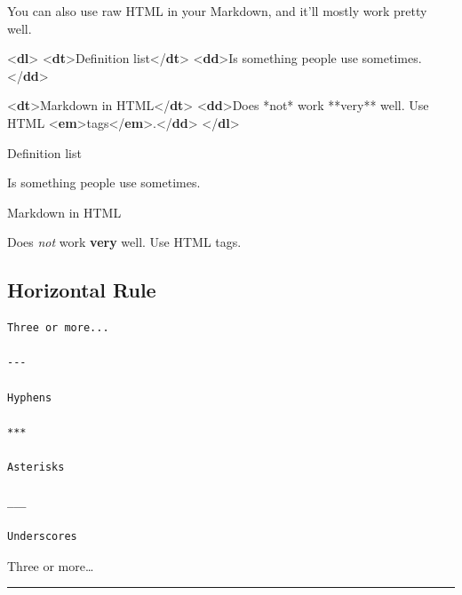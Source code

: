 \documentclass[
]{article}
\newenvironment{Shaded}{}{}
\newcommand{\DataTypeTok}[1]{\textcolor[rgb]{0.56,0.13,0.00}{#1}}
\newcommand{\KeywordTok}[1]{\textcolor[rgb]{0.00,0.44,0.13}{\textbf{#1}}}
\newcommand{\NormalTok}[1]{#1}
\begin{document}
You can also use raw HTML in your Markdown, and it'll mostly work pretty
well.

\begin{Shaded}
\begin{Highlighting}[]
\DataTypeTok{\textless{}}\KeywordTok{dl}\DataTypeTok{\textgreater{}}
  \DataTypeTok{\textless{}}\KeywordTok{dt}\DataTypeTok{\textgreater{}}\NormalTok{Definition list}\DataTypeTok{\textless{}/}\KeywordTok{dt}\DataTypeTok{\textgreater{}}
  \DataTypeTok{\textless{}}\KeywordTok{dd}\DataTypeTok{\textgreater{}}\NormalTok{Is something people use sometimes.}\DataTypeTok{\textless{}/}\KeywordTok{dd}\DataTypeTok{\textgreater{}}

  \DataTypeTok{\textless{}}\KeywordTok{dt}\DataTypeTok{\textgreater{}}\NormalTok{Markdown in HTML}\DataTypeTok{\textless{}/}\KeywordTok{dt}\DataTypeTok{\textgreater{}}
  \DataTypeTok{\textless{}}\KeywordTok{dd}\DataTypeTok{\textgreater{}}\NormalTok{Does *not* work **very** well. Use HTML }\DataTypeTok{\textless{}}\KeywordTok{em}\DataTypeTok{\textgreater{}}\NormalTok{tags}\DataTypeTok{\textless{}/}\KeywordTok{em}\DataTypeTok{\textgreater{}}\NormalTok{.}\DataTypeTok{\textless{}/}\KeywordTok{dd}\DataTypeTok{\textgreater{}}
\DataTypeTok{\textless{}/}\KeywordTok{dl}\DataTypeTok{\textgreater{}}
\end{Highlighting}
\end{Shaded}

Definition list

Is something people use sometimes.

Markdown in HTML

Does \emph{not} work \textbf{very} well. Use HTML tags.

\subsection{Horizontal Rule}\label{horizontal-rule}

\begin{verbatim}
Three or more...

---

Hyphens

***

Asterisks

___

Underscores
\end{verbatim}

Three or more\ldots{}

\begin{center}\rule{0.5\linewidth}{0.5pt}\end{center}
\end{document}
